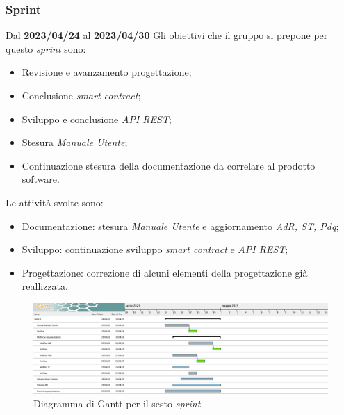 \subsubsection{ Sprint}
Dal \textbf{2023/04/24} al \textbf{2023/04/30}
\newline
Gli obiettivi che il gruppo si prepone per questo \textit{sprint} sono:
\begin{itemize}
    \item Revisione e avanzamento progettazione;
    \item Conclusione \textit{smart contract};
    \item Sviluppo e conclusione \textit{API REST};
    \item Stesura \textit{Manuale Utente};
    \item Continuazione stesura della documentazione da correlare al prodotto software.
\end{itemize}
Le attività svolte sono:
\begin{itemize}
    \item Documentazione: stesura \textit{Manuale Utente} e aggiornamento \textit{AdR, ST, Pdq};
    \item Sviluppo: continuazione sviluppo \textit{smart contract} e \textit{API REST};
    \item Progettazione: correzione di alcuni elementi della progettazione già reallizzata.
\end{itemize}
\begin{figure}[H]
    \centering
    \includegraphics[width=\textwidth]{src/img/Sprint 6.png}
    \caption{Diagramma di Gantt per il sesto \textit{sprint}}
\end{figure}
